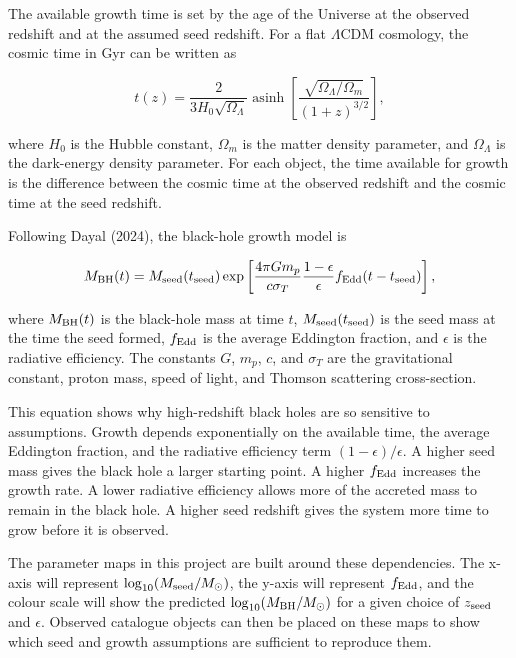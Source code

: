 \documentclass[letterpaper,12pt]{article}
\begin{document}
The available growth time is set by the age of the Universe at the observed redshift and at the assumed seed redshift. For a flat $\Lambda$CDM cosmology, the cosmic time in Gyr can be written as

\begin{equation}
t(z) =
\frac{2}{3H_0\sqrt{\Omega_{\Lambda}}}
\operatorname{asinh}
\left[
\frac{\sqrt{\Omega_{\Lambda}/\Omega_m}}{(1+z)^{3/2}}
\right],
\label{eq:cosmic_time}
\end{equation}

where $H_0$ is the Hubble constant, $\Omega_m$ is the matter density parameter, and $\Omega_{\Lambda}$ is the dark-energy density parameter. For each object, the time available for growth is the difference between the cosmic time at the observed redshift and the cosmic time at the seed redshift.

Following Dayal (2024), the black-hole growth model is

\begin{equation}
M_{\rm BH}(t) =
M_{\rm seed}(t_{\rm seed})
\exp
\left[
\frac{4\pi G m_p}{c\sigma_T}
\frac{1-\epsilon}{\epsilon}
f_{\rm Edd}
(t-t_{\rm seed})
\right],
\label{eq:bh_mass_growth}
\end{equation}

where $M_{\rm BH}(t)$ is the black-hole mass at time $t$, $M_{\rm seed}(t_{\rm seed})$ is the seed mass at the time the seed formed, $f_{\rm Edd}$ is the average Eddington fraction, and $\epsilon$ is the radiative efficiency. The constants $G$, $m_p$, $c$, and $\sigma_T$ are the gravitational constant, proton mass, speed of light, and Thomson scattering cross-section.

This equation shows why high-redshift black holes are so sensitive to assumptions. Growth depends exponentially on the available time, the average Eddington fraction, and the radiative efficiency term $(1-\epsilon)/\epsilon$. A higher seed mass gives the black hole a larger starting point. A higher $f_{\rm Edd}$ increases the growth rate. A lower radiative efficiency allows more of the accreted mass to remain in the black hole. A higher seed redshift gives the system more time to grow before it is observed.

The parameter maps in this project are built around these dependencies. The x-axis will represent $\log_{10}(M_{\rm seed}/M_{\odot})$, the y-axis will represent $f_{\rm Edd}$, and the colour scale will show the predicted $\log_{10}(M_{\rm BH}/M_{\odot})$ for a given choice of $z_{\rm seed}$ and $\epsilon$. Observed catalogue objects can then be placed on these maps to show which seed and growth assumptions are sufficient to reproduce them.
\end{document}
